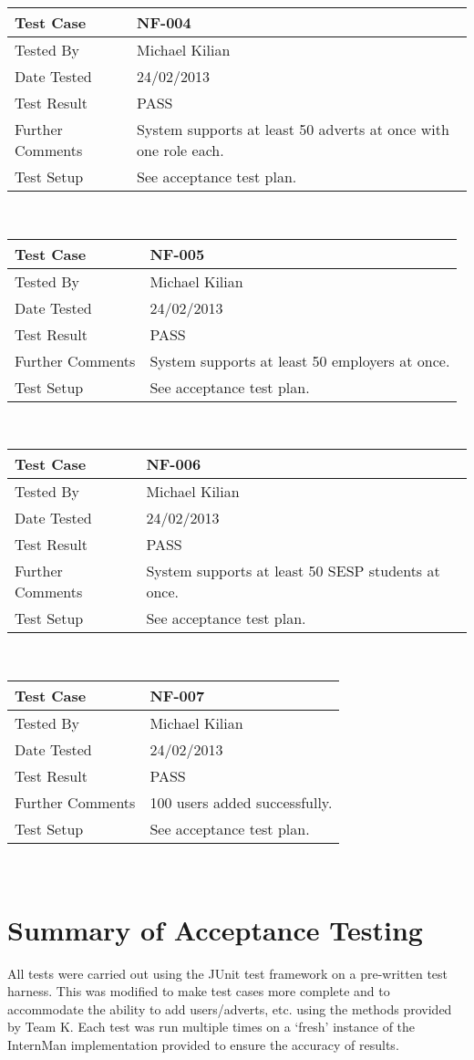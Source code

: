 \documentclass{l3deliverable}
\begin{document}
\begin{tabular}{lp{10cm}}
\hline 
\textbf{Test Case} & NF-004\tabularnewline
\hline 
\hline 
Tested By & Michael Kilian\tabularnewline
\hline 
Date Tested & 24/02/2013\tabularnewline
\hline 
Test Result & PASS\tabularnewline
\hline
Further Comments & System supports at least 50 adverts at once with one role each.\tabularnewline
\hline
Test Setup & See acceptance test plan.\tabularnewline
\hline
\end{tabular}\\

\begin{tabular}{lp{10cm}}
\hline 
\textbf{Test Case} & NF-005\tabularnewline
\hline 
\hline 
Tested By & Michael Kilian\tabularnewline
\hline 
Date Tested & 24/02/2013\tabularnewline
\hline 
Test Result & PASS\tabularnewline
\hline
Further Comments & System supports at least 50 employers at once.\tabularnewline
\hline
Test Setup & See acceptance test plan.\tabularnewline
\hline
\end{tabular}\\

\begin{tabular}{lp{10cm}}
\hline 
\textbf{Test Case} & NF-006\tabularnewline
\hline 
\hline 
Tested By & Michael Kilian\tabularnewline
\hline 
Date Tested & 24/02/2013\tabularnewline
\hline 
Test Result & PASS\tabularnewline
\hline
Further Comments & System supports at least 50 SESP students at once.\tabularnewline
\hline
Test Setup & See acceptance test plan.\tabularnewline
\hline
\end{tabular}\\

\begin{tabular}{lp{10cm}}
\hline 
\textbf{Test Case} & NF-007\tabularnewline
\hline 
\hline 
Tested By & Michael Kilian\tabularnewline
\hline 
Date Tested & 24/02/2013\tabularnewline
\hline 
Test Result & PASS\tabularnewline
\hline
Further Comments & 100 users added successfully.\tabularnewline
\hline
Test Setup & See acceptance test plan.\tabularnewline
\hline
\end{tabular}\\
\newpage 

\section{Summary of Acceptance Testing}
All tests were carried out using the JUnit test framework on a pre-written test harness. This was modified to make test cases more complete and to accommodate the ability to add users/adverts, etc. using the methods provided by Team K. Each test was run multiple times on a `fresh' instance of the InternMan implementation provided to ensure the accuracy of results.\\
\end{document}
